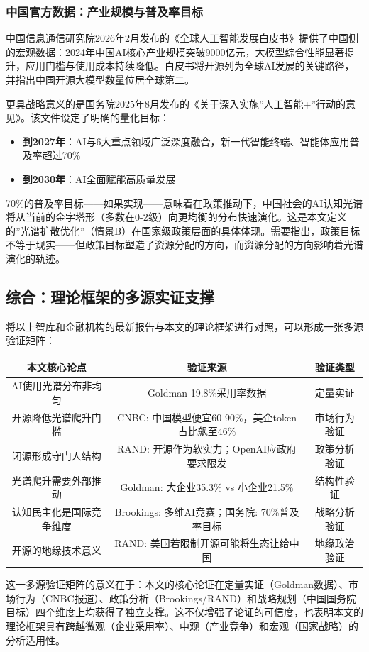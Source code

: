 \subsubsection{中国官方数据：产业规模与普及率目标}

中国信息通信研究院2026年2月发布的《全球人工智能发展白皮书》提供了中国侧的宏观数据：2024年中国AI核心产业规模突破9000亿元，大模型综合性能显著提升，应用门槛与使用成本持续降低。白皮书将开源列为全球AI发展的关键路径，并指出中国开源大模型数量位居全球第二。

更具战略意义的是国务院2025年8月发布的《关于深入实施''人工智能+''行动的意见》。该文件设定了明确的量化目标：
\begin{itemize}
\item \textbf{到2027年}：AI与6大重点领域广泛深度融合，新一代智能终端、智能体应用普及率超过70\%
\item \textbf{到2030年}：AI全面赋能高质量发展
\end{itemize}

70\%的普及率目标——如果实现——意味着在政策推动下，中国社会的AI认知光谱将从当前的金字塔形（多数在0-2级）向更均衡的分布快速演化。这是本文定义的''光谱扩散优化''（情景B）在国家级政策层面的具体体现。需要指出，政策目标不等于现实——但政策目标塑造了资源分配的方向，而资源分配的方向影响着光谱演化的轨迹。

\subsection{综合：理论框架的多源实证支撑}

将以上智库和金融机构的最新报告与本文的理论框架进行对照，可以形成一张多源验证矩阵：

\begin{center}
\begin{tabular}{c|c|c}
\hline
本文核心论点 & 验证来源 & 验证类型 \\
\hline
AI使用光谱分布非均匀 & Goldman 19.8\%采用率数据 & 定量实证 \\
开源降低光谱爬升门槛 & CNBC: 中国模型便宜60-90\%，美企token占比飙至46\% & 市场行为验证 \\
闭源形成守门人结构 & RAND: 开源作为软实力；OpenAI应政府要求限发 & 政策分析验证 \\
光谱爬升需要外部推动 & Goldman: 大企业35.3\% vs 小企业21.5\% & 结构性验证 \\
认知民主化是国际竞争维度 & Brookings: 多维AI竞赛；国务院: 70\%普及率目标 & 战略分析验证 \\
开源的地缘技术意义 & RAND: 美国若限制开源可能将生态让给中国 & 地缘政治验证 \\
\hline
\end{tabular}
\end{center}

这一多源验证矩阵的意义在于：本文的核心论证在定量实证（Goldman数据）、市场行为（CNBC报道）、政策分析（Brookings/RAND）和战略规划（中国国务院目标）四个维度上均获得了独立支撑。这不仅增强了论证的可信度，也表明本文的理论框架具有跨越微观（企业采用率）、中观（产业竞争）和宏观（国家战略）的分析适用性。

